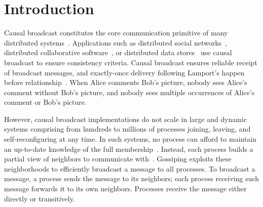  
\section{Introduction}

Causal broadcast constitutes the core communication primitive of many
distributed systems~\cite{hadzilacos1994modular}. Applications such as
distributed social networks~\cite{borthakur2013petabyte}, distributed
collaborative software~\cite{heinrich2012exploiting,nedelec2016crate}, or
distributed data
stores~\cite{bailis2013bolton,bravo2017saturn,demers1987epidemic,lloyd2011cops,shapiro2011comprehensive}
use causal broadcast to ensure consistency criteria.  Causal broadcast ensures
reliable receipt of broadcast messages, and exactly-once delivery following
Lamport's happen before relationship~\cite{lamport1978time}. When Alice comments
Bob's picture, nobody sees Alice's comment without Bob's picture, and nobody
sees multiple occurrences of Alice's comment or Bob's picture.

However, causal broadcast implementations do not scale in large and dynamic
systems comprising from hundreds to millions of processes joining, leaving, and
self-reconfiguring at any time. In such systems, no process can afford to
maintain an up-to-date knowledge of the full
membership~\cite{birman1999bimodal,demers1987epidemic}. Instead, each process
builds a partial view of neighbors to communicate
with~\cite{jelasity2007gossip}. Gossiping exploits these neighborhoods to
efficiently broadcast a message to all processes. To broadcast a message, a
process sends the message to its neighbors; each process receiving such message
forwards it to its own neighbors. Processes receive the message either directly
or transitively.



